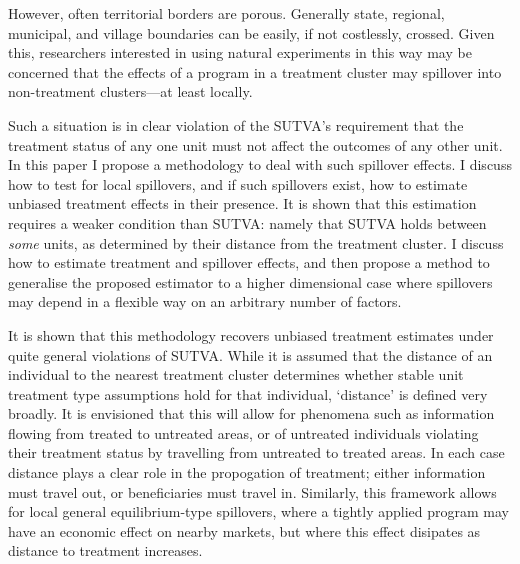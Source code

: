 \documentclass[12pt]{article}
\begin{document}
\begin{spacing}{1.3}
However, often territorial borders are porous.  Generally state, regional,
municipal, and village boundaries can be easily, if not costlessly, crossed.
Given this, researchers interested in using natural experiments in this way may
be concerned that the effects of a program in a treatment cluster may spillover 
into non-treatment clusters---at least locally.

Such a situation is in clear violation of the SUTVA's requirement that the 
treatment status of any one unit must not affect the outcomes of any other unit.  
In this paper I propose a methodology to deal with such spillover effects.  I
discuss how to test for local spillovers, and if such spillovers exist, how to 
estimate unbiased treatment effects in their presence.  It is shown that this 
estimation requires a weaker condition than SUTVA: namely that SUTVA holds 
between \emph{some} units, as determined by their distance from the treatment 
cluster.  I discuss how to estimate treatment and spillover effects, and then
propose a method to generalise the proposed estimator to a higher dimensional 
case where spillovers may depend in a flexible way on an arbitrary number of 
factors.

It is shown that this methodology recovers unbiased treatment estimates under 
quite general violations of SUTVA.  While it is assumed that the distance of 
an individual to the nearest treatment cluster determines whether stable unit 
treatment type assumptions hold for that individual, `distance' is defined 
very broadly.  It is envisioned that this will allow for phenomena such as 
information flowing from treated to untreated areas, or of untreated 
individuals violating their treatment status by travelling from untreated to
treated areas.  In each case distance plays a clear role in the propogation 
of treatment; either information must travel out, or beneficiaries must travel 
in. Similarly, this framework allows for local general equilibrium-type 
spillovers, where a tightly applied program may have an economic effect on 
nearby markets, but where this effect disipates as distance to treatment 
increases.


\end{spacing}
\end{document}
